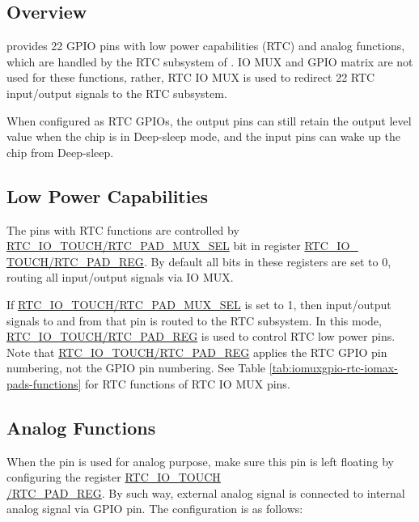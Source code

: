 \documentclass[main\_\_EN.tex]{subfiles}
\begin{document}
\subsection{Overview}

\chipname{} provides 22 GPIO pins with low power capabilities (RTC) and analog functions, which are handled by the RTC subsystem of \chipname{}. IO MUX and GPIO matrix are not used for these functions, rather, RTC IO MUX is used to redirect 22 RTC input/output signals to the RTC subsystem.

When configured as RTC GPIOs, the output pins can still retain the output level value when the chip is in Deep-sleep mode, and the input pins can wake up the chip from Deep-sleep.

\subsection{Low Power Capabilities}

The pins with RTC functions are controlled by \hyperref[fielddesc:RTCIOTOUCHPADNMUXSEL]{RTC\_IO\_TOUCH/RTC\_PAD\_MUX\_SEL} bit in register \hyperref[regdesc:RTCIOTOUCHPADNREG]{RTC\_IO\_\\TOUCH/RTC\_PAD\_REG}. By default all bits in these registers are set to 0, routing all input/output signals via IO MUX.

If \hyperref[fielddesc:RTCIOTOUCHPADNMUXSEL]{RTC\_IO\_TOUCH/RTC\_PAD\_MUX\_SEL} is set to 1, then input/output signals to and from that pin is routed to the RTC subsystem. In this mode, \hyperref[regdesc:RTCIOTOUCHPADNREG]{RTC\_IO\_TOUCH/RTC\_PAD\_REG} is used to control RTC low power pins. Note that \hyperref[regdesc:RTCIOTOUCHPADNREG]{RTC\_IO\_TOUCH/RTC\_PAD\_REG} applies the RTC GPIO pin numbering, not the GPIO pin numbering. See Table \ref{tab:iomuxgpio-rtc-iomax-pads-functions} for RTC functions of RTC IO MUX pins.

\subsection{Analog Functions}

When the pin is used for analog purpose, make sure this pin is left floating by configuring the register \hyperref[regdesc:RTCIOTOUCHPADNREG]{RTC\_IO\_TOUCH\\/RTC\_PAD\_REG}. By such way, external analog signal is connected to internal analog signal via GPIO pin. The configuration is as follows:
\end{document}
